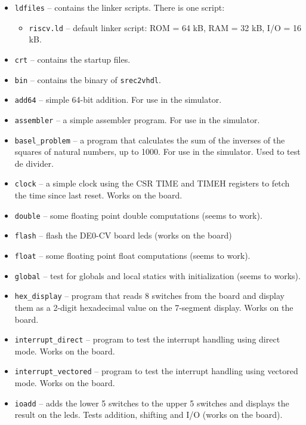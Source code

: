 \documentclass[12pt]{article}
\begin{document}
\begin{itemize}
\item \texttt{ldfiles} -- contains the linker scripts. There is one script:
\begin{itemize}
\item \texttt{riscv.ld} -- default linker script: ROM = 64 kB, RAM = 32 kB, I/O = 16 kB.
\end{itemize}
\item \texttt{crt} -- contains the startup files.
\item \texttt{bin} -- contains the binary of \texttt{srec2vhdl}.
\item \texttt{add64} -- simple 64-bit addition. For use in the simulator.
\item \texttt{assembler} -- a simple assembler program. For use in the simulator.
\item \texttt{basel\_problem} -- a program that calculates the sum of the inverses of the squares of natural numbers, up to 1000. For use in the simulator. Used to test de divider.
\item \texttt{clock} -- a simple clock using the CSR TIME and TIMEH registers to fetch the time since last reset. Works on the board.
\item \texttt{double} -- some floating point double computations (seems to work).
\item \texttt{flash} -- flash the DE0-CV board leds (works on the board)
\item \texttt{float} -- some floating point float computations (seems to work).
\item \texttt{global} -- test for globals and local statics with initialization (seems to works).
\item \texttt{hex\_display} -- program that reads 8 switches from the board and display them as a 2-digit hexadecimal value on the 7-segment display. Works on the board.
\item \texttt{interrupt\_direct} -- program to test the interrupt handling using direct mode. Works on the board.
\item \texttt{interrupt\_vectored} -- program to test the interrupt handling using vectored mode. Works on the board.
\item \texttt{ioadd} -- adds the lower 5 switches to the upper 5 switches and displays the result on the leds. Tests addition, shifting and I/O (works on the board).

\end{itemize}
\end{document}
